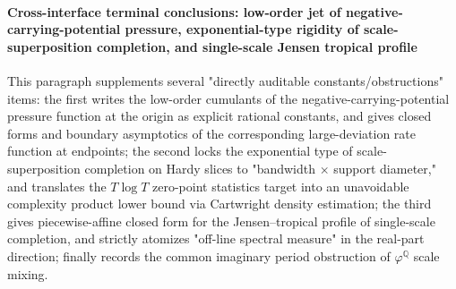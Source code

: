 
\paragraph{Cross-interface terminal conclusions: low-order jet of negative-carrying-potential pressure, exponential-type rigidity of scale-superposition completion, and single-scale Jensen tropical profile}
This paragraph supplements several "directly auditable constants/obstructions" items: the first writes the low-order cumulants of the negative-carrying-potential pressure function at the origin as explicit rational constants,
and gives closed forms and boundary asymptotics of the corresponding large-deviation rate function at endpoints; the second locks the exponential type of scale-superposition completion on Hardy slices to
"bandwidth \(\times\) support diameter," and translates the \(T\log T\) zero-point statistics target into an unavoidable complexity product lower bound via Cartwright density estimation;
the third gives piecewise-affine closed form for the Jensen--tropical profile of single-scale completion, and strictly atomizes "off-line spectral measure" in the real-part direction;
finally records the common imaginary period obstruction of \(\varphi^{\mathbb Q}\) scale mixing.

